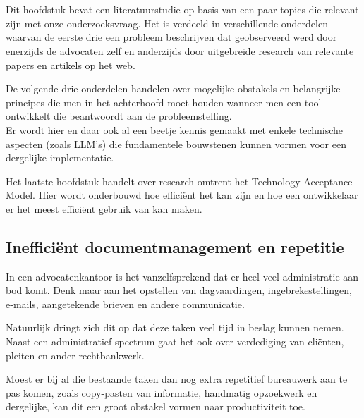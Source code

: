 \chapter{}%
\label{ch:stand-van-zaken}



Dit hoofdstuk bevat een literatuurstudie op basis van een paar topics die relevant zijn met onze onderzoeksvraag. Het is verdeeld in verschillende onderdelen waarvan de eerste drie een probleem
beschrijven dat geobserveerd werd door enerzijds de advocaten zelf en anderzijds door uitgebreide research van relevante papers en artikels op het web.

De volgende drie onderdelen handelen over
mogelijke obstakels en belangrijke principes die men in het achterhoofd moet houden wanneer men een tool ontwikkelt die beantwoordt aan de probleemstelling.\\

Er wordt hier en daar ook al een beetje kennis gemaakt met enkele technische aspecten (zoals LLM's) die fundamentele bouwstenen kunnen vormen voor een dergelijke implementatie.

Het laatste hoofdstuk handelt over research omtrent het Technology Acceptance Model. Hier wordt onderbouwd hoe efficiënt het kan zijn en hoe een ontwikkelaar er het meest efficiënt gebruik
van kan maken.


\section{Inefficiënt documentmanagement en repetitie}
In een advocatenkantoor is het vanzelfsprekend dat er heel veel administratie aan bod komt.
Denk maar aan het opstellen van dagvaardingen,
ingebrekestellingen, e-mails, aangetekende brieven en andere communicatie.

Natuurlijk dringt zich dit op dat deze taken veel tijd in beslag kunnen nemen. Naast een administratief spectrum gaat het ook over verdediging van cliënten, pleiten en ander rechtbankwerk.

\newpage
Moest er bij al die bestaande taken dan nog extra repetitief bureauwerk aan te pas komen, zoals copy-pasten van informatie, handmatig opzoekwerk en dergelijke,
kan dit een groot obstakel vormen naar productiviteit toe.

